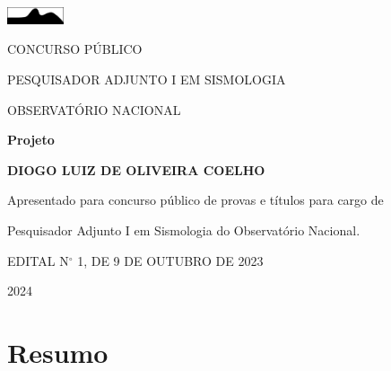 \documentclass[10pt,a4paper,oneside]{book}
\newcommand{\Year}{2024}
\newcommand{\Author}{Diogo Luiz de Oliveira Coelho}
\begin{document}
\pagestyle{plain}
\frontmatter

\begin{titlepage}
  \begin{center}
    \includegraphics[height=0.5cm]{images/logo_seismo.png}
    \vspace{1cm}

    CONCURSO PÚBLICO
    
    PESQUISADOR ADJUNTO I EM SISMOLOGIA
    
    OBSERVATÓRIO NACIONAL

    \vspace{5cm}

    \textbf{\LARGE Projeto}
    \vspace{1cm}

    \textbf{\LARGE \MakeUppercase{\Author{}}}
    \vspace{5cm}

    {\small
	Apresentado para concurso público de provas e títulos para cargo de

	Pesquisador Adjunto I em Sismologia do Observatório Nacional.
      \vspace{1cm}

	EDITAL N$^{\circ}$   1, DE 9 DE OUTUBRO DE 2023
    }
    \vfill

    \Year{}
  \end{center}
\end{titlepage}

\chapter*{Resumo}
\end{document}
